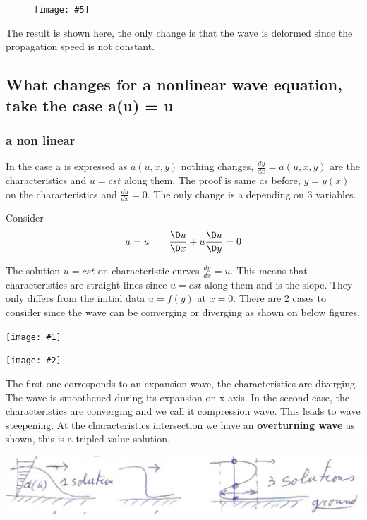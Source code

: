 \documentclass[british,french,11pt, a4paper, openany]{article}
\newcommand{\wrapfig}[6]{%
	\begin{figure}%
		\vspace{-5mm}%
		\texttt{[image: \#5]}%
		\captionof{figure}{}%
		\label{#6}%
	\end{figure}%
}
\newcommand{\minifig}[6]{
	\begin{center}%
		\begin{minipage}{#5\textwidth}%
			\texttt{[image: \#1]}%
			\captionof{figure}{}%
			\label{#1}%
		\end{minipage}%
		\begin{minipage}{#6\textwidth}%
			\texttt{[image: \#2]}%
			\captionof{figure}{}%
			\label{#2}%
		\end{minipage}%
	\end{center}
}
\begin{document}
\wrapfig{7}{l}{5}{0.2}{ch8/10}{ch8/10}
The result is shown here, the only change is that the wave is deformed since the propagation speed is not constant. 



\subsection{What changes for a nonlinear wave equation, take the case a(u) = u}

\subsubsection{a non linear}
In the case a is expressed as $a(u,x,y)$ nothing changes, $\frac{dy}{dx} = a(u,x,y)$ are the characteristics and $u = cst$ along them. The proof is same as before, $y = y(x)$ on the characteristics and $\frac{du}{dx} = 0$. The only change is a depending on 3 variables.  


	
	Consider
	\begin{equation}
	a = u \qquad \frac{\D u}{\D x} + u \frac{\D u }{\D y} = 0 
	\end{equation}
	
	The solution $u=cst$ on characteristic curves $\frac{dy}{dx} = u$. This means that characteristics are straight lines since $u=cst$ along them and is the slope. They only differs from the initial data $u = f(y)$ at $x = 0$. There are 2 cases to consider since the wave can be converging or diverging as shown on below figures. 
	
	\minifig{ch8/11}{ch8/12}{0.3}{0.3}{0.3}{0.3}
	
	The first one corresponds to an expansion wave, the characteristics are diverging. The wave is smoothened during its expansion on x-axis. In the second case, the characteristics are converging and we call it compression wave. This leads to wave steepening. At the characteristics intersection we have an \textbf{overturning wave} as shown, this is a tripled value solution. 
	
	\begin{center}
		\includegraphics[scale=0.3]{ch8/13}
	\end{center}		
	
\end{document}
